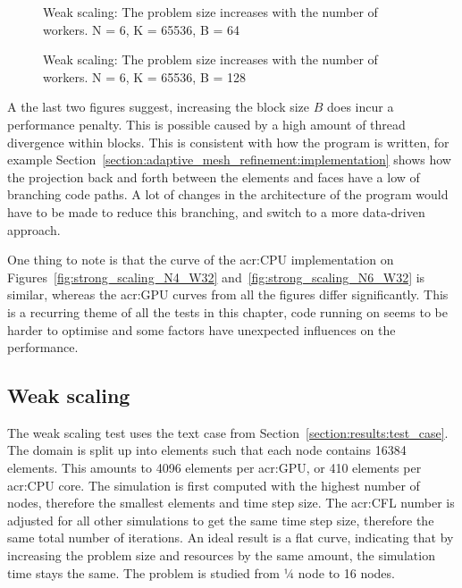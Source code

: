 \begin{figure}[H]
	\centering
	
	\caption{Weak scaling: The problem size increases with the number of workers. N = 6, K = 65536, B = 64}\label{fig:strong_scaling_N6_W64}
\end{figure}

\begin{figure}[H]
	\centering
	
	\caption{Weak scaling: The problem size increases with the number of workers. N = 6, K = 65536, B = 128}\label{fig:strong_scaling_N6_W128}
\end{figure}

A the last two figures suggest, increasing the block size \(B\) does incur a performance penalty.
This is possible caused by a high amount of thread divergence within blocks. This is consistent with
how the program is written, for example
Section~\ref{section:adaptive_mesh_refinement:implementation} shows how the projection back and
forth between the elements and faces have a low of branching code paths. A lot of changes in the
architecture of the program would have to be made to reduce this branching, and switch to a more
data-driven approach.

One thing to note is that the curve of the \acrshort{acr:CPU} implementation on
Figures~\ref{fig:strong_scaling_N4_W32} and~\ref{fig:strong_scaling_N6_W32} is similar, whereas the
\acrshort{acr:GPU} curves from all the figures differ significantly. This is a recurring theme of
all the tests in this chapter, code running on  seems to be harder to optimise
and some factors have unexpected influences on the performance.

\subsection{Weak scaling}\label{subsection:results:scaling_tests:weak}

The weak scaling test uses the text case from Section~\ref{section:results:test_case}. The domain is
split up into elements such that each node contains 16384 elements. This amounts to 4096 elements
per \acrshort{acr:GPU}, or 410 elements per \acrshort{acr:CPU} core. The simulation is first
computed with the highest number of nodes, therefore the smallest elements and time step size. The
\acrshort{acr:CFL} number is adjusted for all other simulations to get the same time step size,
therefore the same total number of iterations. An ideal result is a flat curve, indicating that by
increasing the problem size and resources by the same amount, the simulation time stays the same.
The problem is studied from ¼ node to 16 nodes.


